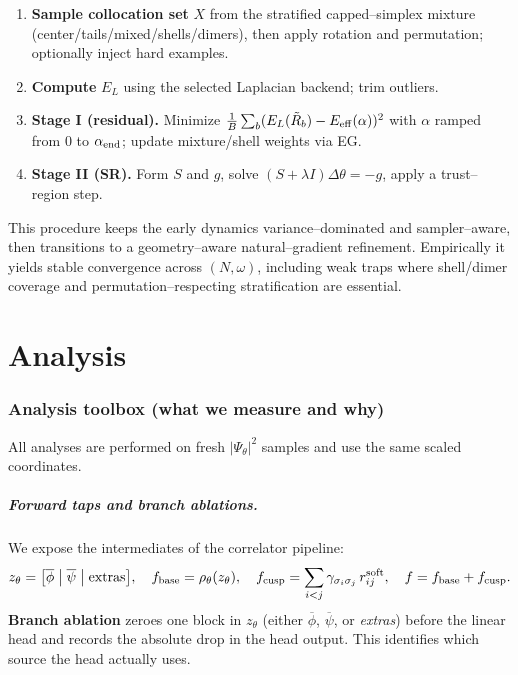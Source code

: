 \begin{enumerate}
  \item \textbf{Sample collocation set} $X$ from the stratified capped–simplex mixture (center/tails/mixed/shells/dimers), then apply rotation and permutation; optionally inject hard examples.
  \item \textbf{Compute} $E_L$ using the selected Laplacian backend; trim outliers.
  \item \textbf{Stage I (residual).} Minimize $\frac{1}{B}\sum_b(E_L(\tilde R_b)-E_{\rm eff}(\alpha))^2$ with $\alpha$ ramped from $0$ to $\alpha_{\rm end}$; update mixture/shell weights via EG.
  \item \textbf{Stage II (SR).} Form $S$ and $g$, solve $(S+\lambda I)\Delta\theta=-g$, apply a trust–region step.
\end{enumerate}
This procedure keeps the early dynamics variance–dominated and sampler–aware, then transitions to a geometry–aware natural–gradient refinement. Empirically it yields stable convergence across $(N,\omega)$, including weak traps where shell/dimer coverage and permutation–respecting stratification are essential.

\chapter{Analysis}
\label{ch:analysis}

\subsection{Analysis toolbox (what we measure and why)}
\label{subsec:toolbox}
All analyses are performed on fresh $|\Psi_\theta|^2$ samples and use the same scaled coordinates.

\paragraph{Forward taps and branch ablations.}
We expose the intermediates of the correlator pipeline:
\[
z_\theta=\big[\overline\phi\;\big|\;\overline\psi\;\big|\;\mathrm{extras}\big],\quad
f_{\rm base}=\rho_\theta(z_\theta),\quad
f_{\rm cusp}=\sum_{i<j}\gamma_{\sigma_i\sigma_j}\,r^{\rm soft}_{ij},\quad
f=f_{\rm base}+f_{\rm cusp}.
\]
\textbf{Branch ablation} zeroes one block in $z_\theta$ (either $\overline\phi$, $\overline\psi$, or \textit{extras}) before the linear head and records the absolute drop in the head output. This identifies which source the head actually uses.

